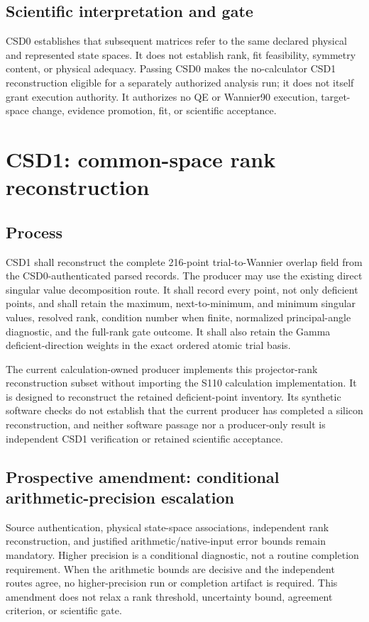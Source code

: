 \documentclass[11pt]{report}
\begin{document}
\section{Scientific interpretation and gate}

CSD0 establishes that subsequent matrices refer to the same declared physical and
represented state spaces.  It does not establish rank, fit feasibility, symmetry
content, or physical adequacy.  Passing CSD0 makes the no-calculator CSD1 reconstruction eligible for a separately
authorized analysis run; it does not itself grant execution authority.  It authorizes
no QE or Wannier90 execution, target-space change, evidence promotion, fit, or
scientific acceptance.

\chapter{CSD1: common-space rank reconstruction}

\section{Process}

CSD1 shall reconstruct the complete 216-point trial-to-Wannier overlap field from the
CSD0-authenticated parsed records.  The producer may use the existing direct singular
value decomposition route.  It shall record every point, not only deficient points, and
shall retain the maximum, next-to-minimum, and minimum singular values, resolved rank,
condition number when finite, normalized principal-angle diagnostic, and the full-rank
gate outcome.  It shall also retain the Gamma deficient-direction weights in the exact
ordered atomic trial basis.

The current calculation-owned producer implements this projector-rank reconstruction
subset without importing the S110 calculation implementation.  It is designed to
reconstruct the retained deficient-point inventory.  Its synthetic software checks do
not establish that the current producer has completed a silicon reconstruction, and
neither software passage nor a producer-only result is independent CSD1 verification
or retained scientific acceptance.

\section{Prospective amendment: conditional arithmetic-precision escalation}

Source authentication, physical state-space associations, independent rank
reconstruction, and justified arithmetic/native-input error bounds remain mandatory.
Higher precision is a conditional diagnostic, not a routine completion requirement.
When the arithmetic bounds are decisive and the independent routes agree, no
higher-precision run or completion artifact is required.  This amendment does not
relax a rank threshold, uncertainty bound, agreement criterion, or scientific gate.
\end{document}
